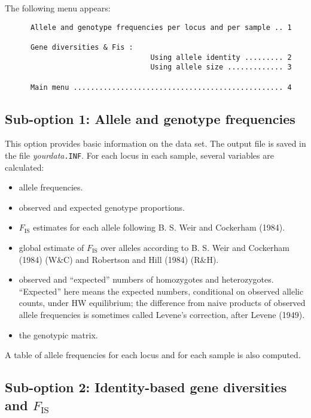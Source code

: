 \documentclass[
  12pt,
]{book}
\begin{document}
The following menu appears:

\begin{verbatim}
      Allele and genotype frequencies per locus and per sample .. 1

      Gene diversities & Fis :
                                  Using allele identity ......... 2
                                  Using allele size ............. 3

      Main menu ................................................. 4
\end{verbatim}

\hypertarget{sub-option-1-allele-and-genotype-frequencies}{%
\subsection{Sub-option 1: Allele and genotype frequencies}\label{sub-option-1-allele-and-genotype-frequencies}}

This option provides basic information on the data set. The output file is saved in the file \emph{yourdata}\texttt{.INF}. For each locus in each sample, several variables are calculated:

\begin{itemize}
\item
  allele frequencies.
\item
  observed and expected genotype proportions.
\item
  \(F_\mathrm{IS}\) estimates for each allele following B. S. Weir and Cockerham (1984).
\item
  global estimate of \(F_\mathrm{IS}\) over alleles according to B. S. Weir and Cockerham (1984) (W\&C) and Robertson and Hill (1984) (R\&H).
\item
  observed and ``expected'' numbers of homozygotes and heterozygotes. ``Expected'' here means the expected numbers, conditional on observed allelic counts, under HW equilibrium; the difference from naive products of observed allele frequencies is sometimes called Levene's correction, after Levene (1949).
\item
  the genotypic matrix.
\end{itemize}

A table of allele frequencies for each locus and for each sample is also computed.

\hypertarget{sub-option-2-identity-based-gene-diversities-and-f_mathrmis}{%
\subsection{\texorpdfstring{Sub-option 2: Identity-based gene diversities and \(F_\mathrm{IS}\)}{Sub-option 2: Identity-based gene diversities and F\_\textbackslash mathrm\{IS\}}}\label{sub-option-2-identity-based-gene-diversities-and-f_mathrmis}}
\end{document}
